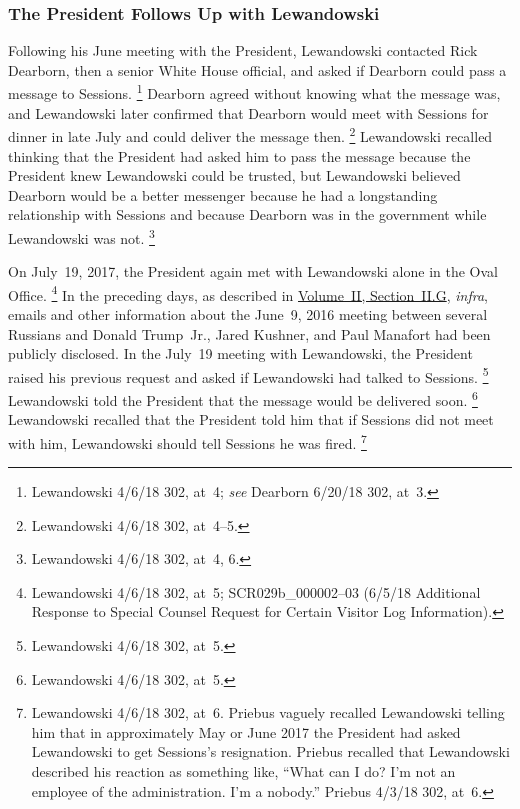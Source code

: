 \subsubsection{The President Follows Up with Lewandowski}

Following his June meeting with the President, Lewandowski contacted Rick Dearborn, then a senior White House official, and asked if Dearborn could pass a message to Sessions.%
\footnote{Lewandowski 4/6/18 302, at~4;
\textit{see} Dearborn 6/20/18 302, at~3.}
Dearborn agreed without knowing what the message was, and Lewandowski later confirmed that Dearborn would meet with Sessions for dinner in late July and could deliver the message then.%
\footnote{Lewandowski 4/6/18 302, at~4--5.}
Lewandowski recalled thinking that the President had asked him to pass the message because the President knew Lewandowski could be trusted, but Lewandowski believed Dearborn would be a better messenger because he had a longstanding relationship with Sessions and because Dearborn was in the government while Lewandowski was not.%
\footnote{Lewandowski 4/6/18 302, at~4, 6.}

On July~19, 2017, the President again met with Lewandowski alone in the Oval Office.%
\footnote{Lewandowski 4/6/18 302, at~5;
SCR029b\_000002--03 (6/5/18 Additional Response to Special Counsel Request for Certain Visitor Log Information).}
In the preceding days, as described in \hyperlink{subsection.2.2.7}{Volume~II, Section~II.G}, \textit{infra}, emails and other information about the June~9, 2016 meeting between several Russians and Donald Trump~Jr., Jared Kushner, and Paul Manafort had been publicly disclosed.
In the July~19 meeting with Lewandowski, the President raised his previous request and asked if Lewandowski had talked to Sessions.%
\footnote{Lewandowski 4/6/18 302, at~5.}
Lewandowski told the President that the message would be delivered soon.%
\footnote{Lewandowski 4/6/18 302, at~5.}
Lewandowski recalled that the President told him that if Sessions did not meet with him, Lewandowski should tell Sessions he was fired.%
\footnote{Lewandowski 4/6/18 302, at~6.
Priebus vaguely recalled Lewandowski telling him that in approximately May or June 2017 the President had asked Lewandowski to get Sessions's resignation.
Priebus recalled that Lewandowski described his reaction as something like, ``What can I do?
I'm not an employee of the administration.
I'm a nobody.''
Priebus 4/3/18 302, at~6.}

